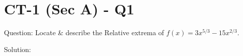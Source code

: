 \documentclass[11pt, a4paper]{article}
\begin{document}

\section*{CT-1 (Sec A) - Q1}

Question:
Locate \& describe the Relative extrema of $f(x) = 3x^{5/3} - 15x^{2/3}$.

Solution:
\end{document}
